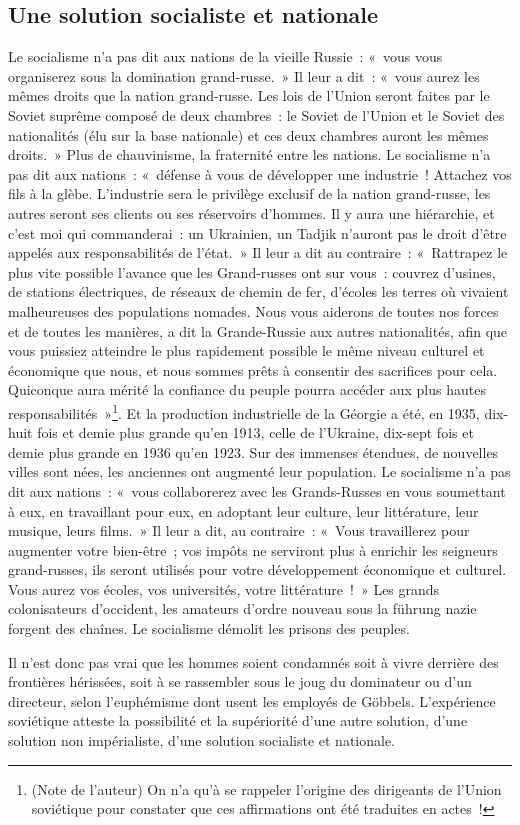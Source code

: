 \documentclass[french,twoside]{book} %
\begin{document}
\subsection[Une solution socialiste et nationale]{Une solution socialiste et nationale}
\noindent Le socialisme n’a pas dit aux nations de la vieille Russie : « vous vous organiserez sous la domination grand-russe. » Il leur a dit : « vous aurez les mêmes droits que la nation grand-russe. Les lois de l’Union seront faites par le Soviet suprême composé de deux chambres : le Soviet de l’Union et le Soviet des nationalités (élu sur la base nationale) et ces deux chambres auront les mêmes droits. » Plus de chauvinisme, la fraternité entre les nations. Le socialisme n’a pas dit aux nations : « défense à vous de développer une industrie ! Attachez vos fils à la glèbe. L’industrie sera le privilège exclusif de la nation grand-russe, les autres seront ses clients ou ses réservoirs d’hommes. Il y aura une hiérarchie, et c’est moi qui commanderai : un Ukrainien, un Tadjik n’auront pas le droit d’être appelés aux responsabilités de l’état. » Il leur a dit au contraire : « Rattrapez le plus vite possible l’avance que les Grand-russes ont sur vous : couvrez d’usines, de stations électriques, de réseaux de chemin de fer, d’écoles les terres où vivaient malheureuses des populations nomades. Nous vous aiderons de toutes nos forces et de toutes les manières, a dit la Grande-Russie aux autres nationalités, afin que vous puissiez atteindre le plus rapidement possible le même niveau culturel et économique que nous, et nous sommes prêts à consentir des sacrifices pour cela. Quiconque aura mérité la confiance du peuple pourra accéder aux plus hautes responsabilités »\footnote{(Note de l’auteur) On n’a qu’à se rappeler l’origine des dirigeants de l’Union soviétique pour constater que ces affirmations ont été traduites en actes !}. Et la production industrielle de la Géorgie a été, en 1935, dix-huit fois et demie plus grande qu’en 1913, celle de l’Ukraine, dix-sept fois et demie plus grande en 1936 qu’en 1923. Sur des immenses étendues, de nouvelles villes sont nées, les anciennes ont augmenté leur population. Le socialisme n’a pas dit aux nations : « vous collaborerez avec les Grands-Russes en vous soumettant à eux, en travaillant pour eux, en adoptant leur culture, leur littérature, leur musique, leurs films. » Il leur a dit, au contraire : « Vous travaillerez pour augmenter votre bien-être ; vos impôts ne serviront plus à enrichir les seigneurs grand-russes, ils seront utilisés pour votre développement économique et culturel. Vous aurez vos écoles, vos universités, votre littérature ! » Les grands colonisateurs d’occident, les amateurs d’ordre nouveau sous la führung nazie forgent des chaînes. Le socialisme démolit les prisons des peuples.\par
Il n’est donc pas vrai que les hommes soient condamnés soit à vivre derrière des frontières hérissées, soit à se rassembler sous le joug du dominateur ou d’un directeur, selon l’euphémisme dont usent les employés de Göbbels. L’expérience soviétique atteste la possibilité et la supériorité d’une autre solution, d’une solution non impérialiste, d’une solution socialiste et nationale.
\end{document}
